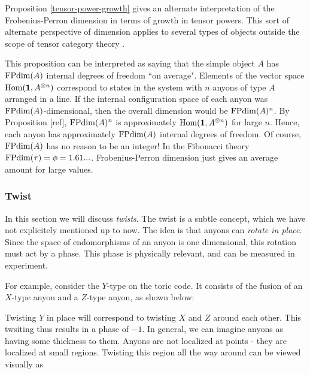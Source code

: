 \begin{rem}
Proposition \ref{tensor-power-growth} gives an alternate interpretation of the Frobenius-Perron dimension in terms of growth in tensor powers. This sort of alternate perspective of dimension applies to several types of objects outside the scope of tensor category theory \cite{coulembier2024growth}.

This proposition can be interpreted as saying that the simple object $A$ has $\operatorname{FPdim}(A)$ internal degrees of freedom ``on average". Elements of the vector space $\operatorname{Hom}({\mathbf 1},A^{\otimes n})$ correspond to states in the system with $n$ anyons of type $A$ arranged in a line. If the internal configuration space of each anyon was $\operatorname{FPdim}(A)$-dimensional, then the overall dimension would be $\operatorname{FPdim}(A)^n$. By Proposition [ref], $\operatorname{FPdim}(A)^n$ is approximately $\operatorname{Hom}({\mathbf 1},A^{\otimes n})$ for large $n$. Hence, each anyon has approximately $\operatorname{FPdim}(A)$ internal degrees of freedom. Of course, $\operatorname{FPdim}(A)$ has no reason to be an integer! In the Fibonacci theory $\operatorname{FPdim}(\tau)=\phi=1.61...$. Frobenius-Perron dimension just gives an average amount for large values.

\end{rem}

\subsubsection{Twist}

In this section we will discuss {\em twists}. The twist is a subtle concept, which we have not explicitely mentioned up to now. The idea is that anyons can {\em rotate in place}. Since the space of endomorphisms of an anyon is one dimensional, this rotation must act by a phase. This phase is physically relevant, and can be measured in experiment.

For example, consider the $Y$-type on the toric code. It consists of the fusion of an $X$-type anyon and a $Z$-type anyon, as shown below:


Twisting $Y$ in place will correspond to twisting $X$ and $Z$ around each other. This twsiting thus results in a phase of $-1$. In general, we can imagine anyons as having some thickness to them. Anyons are not localized at points - they are localized at small regions. Twisting this region all the way around can be viewed visually as

